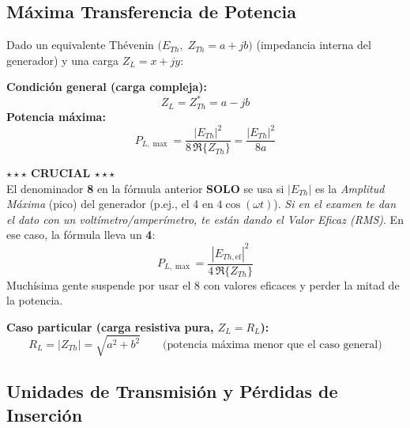 \documentclass[12pt,a4paper]{article}
\begin{document}
\subsection{Máxima Transferencia de Potencia}

Dado un equivalente Thévenin $\bigl(E_{Th},\;Z_{Th} = a + jb\bigr)$ (impedancia interna del generador) y una carga
$Z_L = x + jy$:

\begin{formulabox}
\textbf{Condición general (carga compleja):}
\[
  Z_L = Z_{Th}^* = a - jb
\]
\textbf{Potencia máxima:}
\[
  P_{L,\max} = \frac{|E_{Th}|^2}{8\,\Re\{Z_{Th}\}} = \frac{|E_{Th}|^2}{8a}
\]

\begin{warnbox}
\textbf{\color{warnorangeline}$\star\star\star$ CRUCIAL $\star\star\star$}\\[4pt]
El denominador \textbf{8} en la fórmula anterior \textbf{SOLO} se usa si $|E_{Th}|$
es la \emph{Amplitud Máxima} (pico) del generador (p.ej., el 4 en $4\cos(\omega t)$).
\emph{Si en el examen te dan el dato con un voltímetro/amperímetro, te están dando
el Valor Eficaz (RMS)}. En ese caso, la fórmula lleva un \textbf{4}:
\[
  P_{L,\max} = \frac{|E_{Th,\mathrm{ef}}|^2}{4\,\Re\{Z_{Th}\}}
\]
Muchísima gente suspende por usar el 8 con valores eficaces y perder la mitad
de la potencia.
\end{warnbox}

\vspace{6pt}
\textbf{Caso particular (carga resistiva pura, $Z_L = R_L$):}
\[
  R_L = |Z_{Th}| = \sqrt{a^2 + b^2}
  \qquad\text{(potencia máxima menor que el caso general)}
\]
\end{formulabox}
\clearpage %
\subsection{Unidades de Transmisión y Pérdidas de Inserción}
\end{document}
